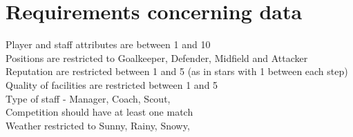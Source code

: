 \documentclass{report}
\begin{document}
\section{Requirements concerning data}
Player and staff attributes are between 1 and 10 \\ 
Positions are restricted to Goalkeeper, Defender, Midfield and Attacker \\ 
Reputation are restricted between 1 and 5 (as in stars with 1 between each step) \\
Quality of facilities are restricted between 1 and 5 \\ 
Type of staff - Manager, Coach, Scout, \\ 
Competition should have at least one match \\ 
Weather restricted to Sunny, Rainy, Snowy, \\ 
\end{document}
